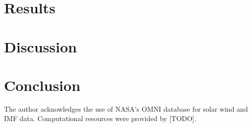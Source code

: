 \documentclass[twocolumn]{revtex4-2}
\begin{document}
\section{Results}
\label{sec:results}

\section{Discussion}
\label{sec:discussion}

\section{Conclusion}
\label{sec:conclusion}

\acknowledgments
The author acknowledges the use of NASA's OMNI database for solar wind
and IMF data. Computational resources were provided by [TODO].



\end{document}

